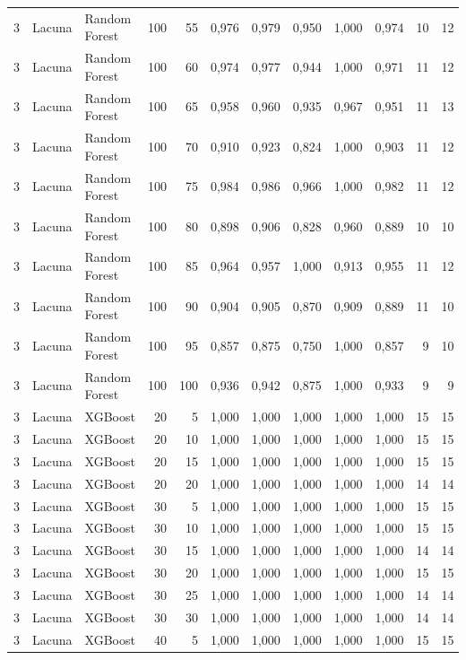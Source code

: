 \begin{longtable}{@{}rllrrrrrrrrr@{}}
3 & Lacuna & Random Forest & 100 & 55 & 0,976 & 0,979 & 0,950 & 1,000 & 0,974 & 10 & 12 \\
3 & Lacuna & Random Forest & 100 & 60 & 0,974 & 0,977 & 0,944 & 1,000 & 0,971 & 11 & 12 \\
3 & Lacuna & Random Forest & 100 & 65 & 0,958 & 0,960 & 0,935 & 0,967 & 0,951 & 11 & 13 \\
3 & Lacuna & Random Forest & 100 & 70 & 0,910 & 0,923 & 0,824 & 1,000 & 0,903 & 11 & 12 \\
3 & Lacuna & Random Forest & 100 & 75 & 0,984 & 0,986 & 0,966 & 1,000 & 0,982 & 11 & 12 \\
3 & Lacuna & Random Forest & 100 & 80 & 0,898 & 0,906 & 0,828 & 0,960 & 0,889 & 10 & 10 \\
3 & Lacuna & Random Forest & 100 & 85 & 0,964 & 0,957 & 1,000 & 0,913 & 0,955 & 11 & 12 \\
3 & Lacuna & Random Forest & 100 & 90 & 0,904 & 0,905 & 0,870 & 0,909 & 0,889 & 11 & 10 \\
3 & Lacuna & Random Forest & 100 & 95 & 0,857 & 0,875 & 0,750 & 1,000 & 0,857 & 9 & 10 \\
3 & Lacuna & Random Forest & 100 & 100 & 0,936 & 0,942 & 0,875 & 1,000 & 0,933 & 9 & 9 \\
3 & Lacuna & XGBoost & 20 & 5 & 1,000 & 1,000 & 1,000 & 1,000 & 1,000 & 15 & 15 \\
3 & Lacuna & XGBoost & 20 & 10 & 1,000 & 1,000 & 1,000 & 1,000 & 1,000 & 15 & 15 \\
3 & Lacuna & XGBoost & 20 & 15 & 1,000 & 1,000 & 1,000 & 1,000 & 1,000 & 15 & 15 \\
3 & Lacuna & XGBoost & 20 & 20 & 1,000 & 1,000 & 1,000 & 1,000 & 1,000 & 14 & 14 \\
3 & Lacuna & XGBoost & 30 & 5 & 1,000 & 1,000 & 1,000 & 1,000 & 1,000 & 15 & 15 \\
3 & Lacuna & XGBoost & 30 & 10 & 1,000 & 1,000 & 1,000 & 1,000 & 1,000 & 15 & 15 \\
3 & Lacuna & XGBoost & 30 & 15 & 1,000 & 1,000 & 1,000 & 1,000 & 1,000 & 14 & 14 \\
3 & Lacuna & XGBoost & 30 & 20 & 1,000 & 1,000 & 1,000 & 1,000 & 1,000 & 15 & 15 \\
3 & Lacuna & XGBoost & 30 & 25 & 1,000 & 1,000 & 1,000 & 1,000 & 1,000 & 14 & 14 \\
3 & Lacuna & XGBoost & 30 & 30 & 1,000 & 1,000 & 1,000 & 1,000 & 1,000 & 14 & 14 \\
3 & Lacuna & XGBoost & 40 & 5 & 1,000 & 1,000 & 1,000 & 1,000 & 1,000 & 15 & 15 \\

\end{longtable}
